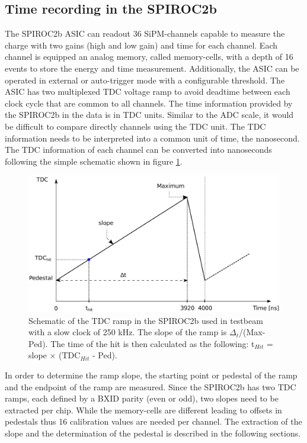 \documentclass{JINST}
\begin{document}
\subsection{Time recording in the SPIROC2b}

The SPIROC2b ASIC can readout 36 SiPM-channels capable to measure the charge with two gains (high and low gain) and time for each channel. Each channel is equipped an analog memory, called memory-cells, with a depth of 16 events to store the energy and time measurement. Additionally, the ASIC can be operated in external or auto-trigger mode with a configurable threshold. The ASIC has two multiplexed TDC voltage ramp to avoid deadtime between each clock cycle that are common to all channels. The time information provided by the SPIROC2b in the data is in TDC units. Similar to the ADC scale, it would be difficult to compare directly channels using the TDC unit. The TDC information needs to be interpreted into a common unit of time, the nanosecond. The TDC information of each channel can be converted into nanoseconds following the simple schematic shown in figure \ref{fig:ConvertTime}.

\begin{figure}[htbp!]
  \centering
  \includegraphics[width=0.9\linewidth]{fig/TDCRamp.eps}
  \caption{Schematic of the TDC ramp in the SPIROC2b used in testbeam with a slow clock of 250 kHz. The slope of the ramp is $\Delta_t$/(Max-Ped). The time of the hit is then calculated as the following: t$_{Hit}$ = slope $\times$ (TDC$_{Hit}$ - Ped).} \label{fig:ConvertTime}
\end{figure}

In order to determine the ramp slope, the starting point or pedestal of the ramp and the endpoint of the ramp are measured. Since the SPIROC2b has two TDC ramps, each defined by a BXID parity (even or odd), two slopes need to be extracted per chip. While the memory-cells are different leading to offsets in pedestals thus 16 calibration values are needed per channel. The extraction of the slope and the determination of the pedestal is described in the following sections.
\end{document}
